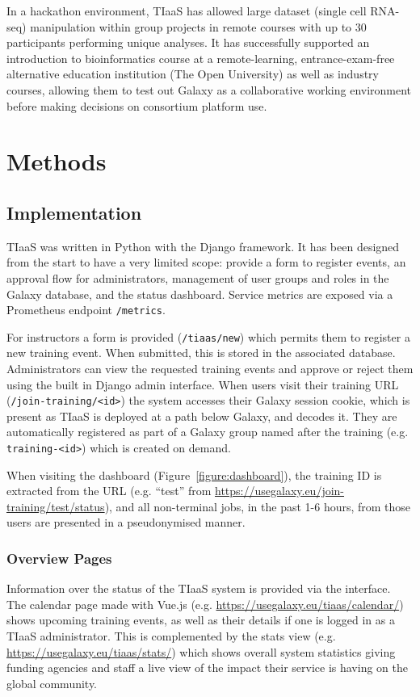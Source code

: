 \documentclass[a4paper,num-refs]{oup-contemporary}
\begin{document}
In a hackathon environment, TIaaS has allowed large dataset (single cell RNA-seq) manipulation within group projects in remote courses with up to 30 participants performing unique analyses\cite{Bacon_2022}. It has successfully supported an introduction to bioinformatics course at a remote-learning, entrance-exam-free alternative education institution (The Open University) as well as industry courses, allowing them to test out Galaxy as a collaborative working environment before making decisions on consortium platform use.

\section{Methods}

\subsection{Implementation}
TIaaS was written in Python with the Django framework. It has been designed from the start to have a very limited scope: provide a form to register events, an approval flow for administrators, management of user groups and roles in the Galaxy database, and the status dashboard. Service metrics are exposed via a Prometheus endpoint \texttt{/metrics}.

For instructors a form is provided (\texttt{/tiaas/new}) which permits them to register a new training event. When submitted, this is stored in the associated database. Administrators can view the requested training events and approve or reject them using the built in Django admin interface. When users visit their  training URL (\texttt{/join-training/<id>}) the system accesses their Galaxy session cookie, which is present as TIaaS is deployed at a path below Galaxy, and decodes it. They are automatically registered as part of a Galaxy group named after the training (e.g. \texttt{training-<id>}) which is created on demand.

When visiting the dashboard (Figure~\ref{figure:dashboard}), the training ID is extracted from the URL (e.g. ``test'' from \url{https://usegalaxy.eu/join-training/test/status}), and all non-terminal jobs, in the past 1-6 hours, from those users are presented in a pseudonymised manner.

\subsubsection{Overview Pages}
Information over the status of the TIaaS system is provided via the interface. The calendar page made with Vue.js (e.g. \url{https://usegalaxy.eu/tiaas/calendar/}) shows upcoming training events, as well as their details if one is logged in as a TIaaS administrator. This is complemented by the stats view (e.g. \url{https://usegalaxy.eu/tiaas/stats/}) which shows overall system statistics giving funding agencies and staff a live view of the impact their service is having on the global community.
\end{document}
